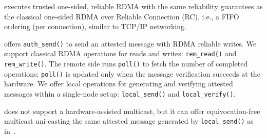 






\projecttitle{} executes trusted one-sided, reliable RDMA with the same reliability guarantees as the classical one-sided RDMA over Reliable Connection (RC), i.e., a FIFO ordering (per connection), similar to TCP/IP networking. %

\projecttitle{} offers {\tt auth\_send()} to send an attested message with RDMA reliable writes.
We support classical RDMA operations for reads and writes: {\tt rem\_read()} and {\tt rem\_write()}. The remote side runs {\tt poll()} to fetch the number of completed operations; {\tt poll()} is updated only when the message verification succeeds at the \projecttitle{} hardware. We offer local operations for generating and verifying attested messages within a single-node setup: {\tt local\_send()} and {\tt local\_verify()}.


\projecttitle{} does not support a hardware-assisted multicast, but it can offer equivocation-free multicast uni-casting the same attested message generated by {\tt local\_send()} as in~\cite{levin2009trinc}.

